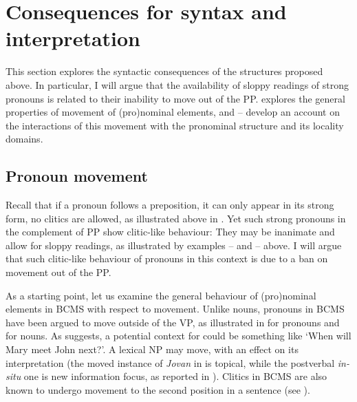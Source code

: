 \documentclass[output=paper,colorlinks,citecolor=brown]{langscibook}
\begin{document}
\section{Consequences for syntax and interpretation}\label{pus:sec:interpretiveproperties}

This section explores the syntactic consequences of the structures proposed above. In particular, I will argue that the availability of sloppy readings of strong pronouns is related to their inability to move out of the PP.   explores the general properties of movement of (pro)nominal elements, and -- develop an account on the interactions of this movement with the pronominal structure and its locality domains. 

\subsection{Pronoun movement}\label{subsec:prnounmovement}

Recall that if a pronoun follows a preposition, it can only appear in its strong form, no clitics are allowed, as illustrated above in . Yet such strong pronouns in the complement of PP show clitic-like behaviour: They may be inanimate and allow for sloppy readings, as illustrated by examples -- and -- above. I will argue that such clitic-like behaviour of pronouns in this context is due to a ban on movement out of the PP. 

As a starting point, let us examine the general behaviour of (pro)nominal elements in BCMS with respect to movement. Unlike nouns, pronouns in BCMS have been argued to move outside of the VP, as illustrated in  for pronouns and  for nouns. As \citet[3]{beslinNPDP} suggests, a potential context for  could be something like `When will Mary meet John next?'. A lexical NP may move, with an effect on its interpretation (the moved instance of \textit{Jovan} in  is topical, while the postverbal \textit{in-situ} one is new information focus, as reported in \citealt{beslinNPDP}). Clitics in BCMS are also known to undergo movement to the second position in a sentence  (see \citealt{boskovic01book,boskovic04,talic18}). 
\end{document}
